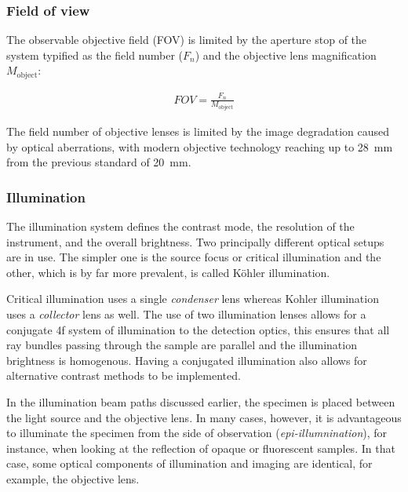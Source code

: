 





\subsubsection{Field of view}

The observable objective field (FOV) is limited by the aperture stop of the system typified as the field number ($F_n $) and the objective lens magnification $M_{\text{object}}$:

\begin{align}
FOV = \frac{F_{n}}{M_{\text{object}}}
\end{align}

The field number of objective lenses is limited by the image degradation caused by optical aberrations, with modern objective technology reaching up to \SI{28}{\milli\meter} from the previous standard of \SI{20}{\milli\meter}.

\subsubsection{Illumination}

The illumination system defines the contrast mode, the resolution of the instrument, and the overall brightness.
Two principally different optical setups are in use.
The simpler one is the source focus or critical illumination and the other, which is by far more prevalent, is called Köhler illumination.

Critical illumination uses a single \emph{condenser} lens whereas Kohler illumination uses a \emph{collector} lens as well.
The use of two illumination lenses allows for a conjugate 4f system of illumination to the detection optics, this ensures that all ray bundles passing through the sample are parallel and the illumination brightness is homogenous.
Having a conjugated illumination also allows for alternative contrast methods to be implemented. %

In the illumination beam paths discussed earlier, the specimen is placed between the light source and the objective lens.
In many cases, however, it is advantageous to illuminate the specimen from the side of observation (\emph{epi-illumnination}), for instance, when looking at the reflection of opaque or fluorescent samples.
In that case, some optical components of illumination and imaging are identical, for example, the objective lens. %


